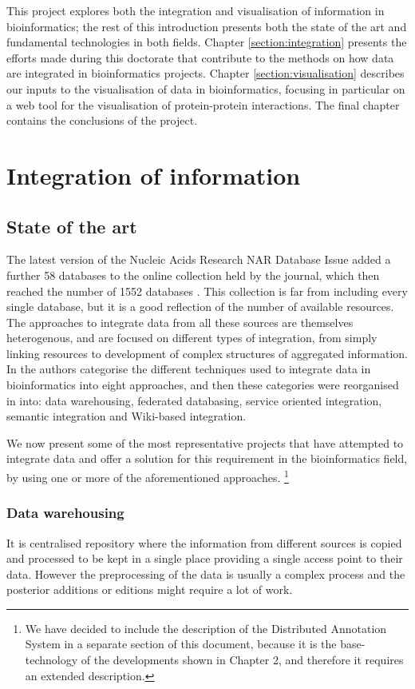 This project explores both the integration and visualisation of information in bioinformatics; the rest of this introduction presents both the state of the art and fundamental technologies in both fields. Chapter \ref{section:integration} presents the efforts made during this doctorate that contribute to the methods on how data are integrated in bioinformatics projects. Chapter \ref{section:visualisation} describes our inputs to the visualisation of data in bioinformatics, focusing in particular on a web tool for the visualisation of protein-protein interactions. The final chapter contains the conclusions of the project.

\section{Integration of information}
\subsection{State of the art}
The latest version of the Nucleic Acids Research NAR Database Issue added a further 58 databases to the online collection held by the journal, which then reached the number of 1552 databases \cite{FER2014}. This collection is far from including every single database, but it is  a good reflection of the number of available resources.
The approaches to integrate data from all these sources are themselves heterogenous, and are focused on different types of integration, from simply linking resources to development of complex structures of aggregated information. In \cite{GOB2008} the authors categorise the different techniques used to integrate data in bioinformatics into eight approaches, and then these categories were reorganised in \cite{ZHA2011b} into: data warehousing, federated databasing, service oriented integration, semantic integration and Wiki-based integration.

We now present some of the most representative projects that have attempted to integrate data and offer a solution for this requirement in the bioinformatics field, by using one or more of the aforementioned approaches. \footnote{We have decided to include the description of the Distributed Annotation System in a separate section of this document, because it is the base-technology of the developments shown in Chapter 2, and therefore it requires an extended description.}

\subsubsection{Data warehousing} \label{subsec:dwh}
It is centralised repository where the information from different sources is copied and processed to be kept  in a single place providing a single access point to their data. However the preprocessing of the data is usually a complex process and the posterior additions or editions might require a lot of work.

